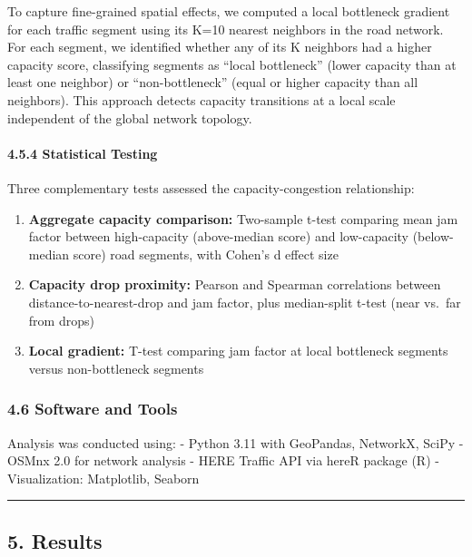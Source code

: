 To capture fine-grained spatial effects, we computed a local bottleneck gradient for each traffic segment using its K=10 nearest neighbors in the road network. For each segment, we identified whether any of its K neighbors had a higher capacity score, classifying segments as ``local bottleneck'' (lower capacity than at least one neighbor) or ``non-bottleneck'' (equal or higher capacity than all neighbors). This approach detects capacity transitions at a local scale independent of the global network topology.

\paragraph{4.5.4 Statistical Testing}\label{statistical-testing}

Three complementary tests assessed the capacity-congestion relationship:

\begin{enumerate}
\def\labelenumi{\arabic{enumi}.}
\tightlist
\item
  \textbf{Aggregate capacity comparison:} Two-sample t-test comparing mean jam factor between high-capacity (above-median score) and low-capacity (below-median score) road segments, with Cohen's d effect size
\item
  \textbf{Capacity drop proximity:} Pearson and Spearman correlations between distance-to-nearest-drop and jam factor, plus median-split t-test (near vs.~far from drops)
\item
  \textbf{Local gradient:} T-test comparing jam factor at local bottleneck segments versus non-bottleneck segments
\end{enumerate}

\subsubsection{4.6 Software and Tools}\label{software-and-tools}

Analysis was conducted using: - Python 3.11 with GeoPandas, NetworkX, SciPy - OSMnx 2.0 for network analysis - HERE Traffic API via hereR package (R) - Visualization: Matplotlib, Seaborn

\begin{center}\rule{0.5\linewidth}{0.5pt}\end{center}

\subsection{5. Results}\label{results}

